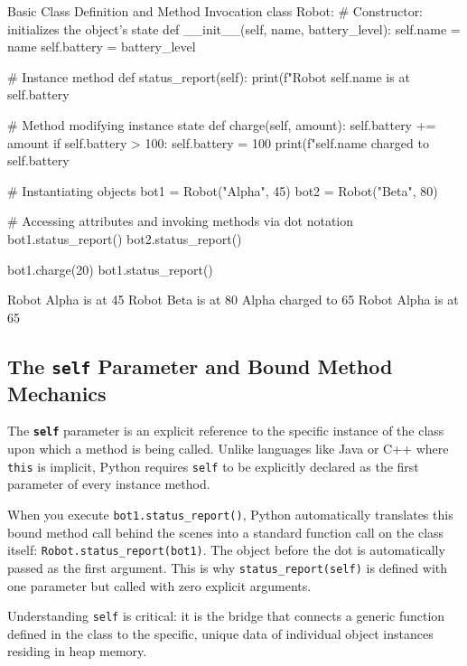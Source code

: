 \begin{pythoncode}{Basic Class Definition and Method Invocation}
class Robot:
    # Constructor: initializes the object's state
    def __init__(self, name, battery_level):
        self.name = name
        self.battery = battery_level
        
    # Instance method
    def status_report(self):
        print(f"Robot {self.name} is at {self.battery}%
        
    # Method modifying instance state
    def charge(self, amount):
        self.battery += amount
        if self.battery > 100:
            self.battery = 100
        print(f"{self.name} charged to {self.battery}%

# Instantiating objects
bot1 = Robot("Alpha", 45)
bot2 = Robot("Beta", 80)

# Accessing attributes and invoking methods via dot notation
bot1.status_report()
bot2.status_report()

bot1.charge(20)
bot1.status_report()
\end{pythoncode}

\begin{outputbox}
Robot Alpha is at 45%
Robot Beta is at 80%
Alpha charged to 65%
Robot Alpha is at 65%
\end{outputbox}

\subsection{The \texttt{self} Parameter and Bound Method Mechanics}
\begin{conceptbox}
The \textbf{\texttt{self}} parameter is an explicit reference to the specific instance of the class upon which a method is being called. Unlike languages like Java or C++ where \texttt{this} is implicit, Python requires \texttt{self} to be explicitly declared as the first parameter of every instance method. 

When you execute \texttt{bot1.status\_report()}, Python automatically translates this bound method call behind the scenes into a standard function call on the class itself: \texttt{Robot.status\_report(bot1)}. The object before the dot is automatically passed as the first argument. This is why \texttt{status\_report(self)} is defined with one parameter but called with zero explicit arguments.
\end{conceptbox}

Understanding \texttt{self} is critical: it is the bridge that connects a generic function defined in the class to the specific, unique data of individual object instances residing in heap memory.

